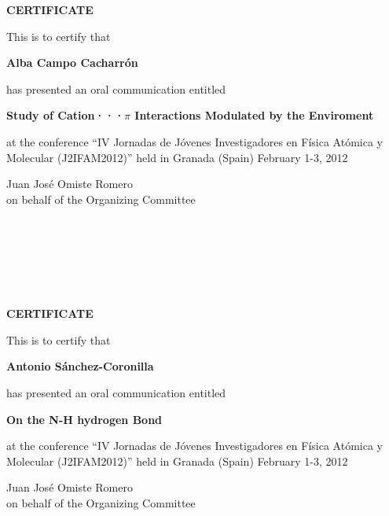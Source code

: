 \documentclass [13pt,a4paper] {letter}
\begin{document}
\begin{verbatim}






\end{verbatim}
\pagestyle{empty}
\begin{center}
{\bf {\Huge CERTIFICATE}}

\vspace {1.5cm}
This is to certify that
\vspace {1cm}

{\bf \Large  Alba  Campo  Cacharrón }
\vspace {1cm}

has presented an oral communication entitled
\vspace {1cm}

{\bf \large  Study of Cation···$\pi$ Interactions Modulated by the Enviroment  }
\vspace {1cm}

at the conference { \textquotedblleft IV Jornadas de Jóvenes Investigadores en Física Atómica y Molecular (J2IFAM2012)\textquotedblright} 
held in Granada (Spain) February 1-3, 2012
\end{center}
\vspace {3cm}
\begin{raggedleft}
Juan José Omiste Romero\\
on behalf of the Organizing Committee
\newpage
\end{raggedleft}
\begin{verbatim}






\end{verbatim}
\pagestyle{empty}
\begin{center}
{\bf {\Huge CERTIFICATE}}

\vspace {1.5cm}
This is to certify that
\vspace {1cm}

{\bf \Large  Antonio    Sánchez-Coronilla }
\vspace {1cm}

has presented an oral communication entitled
\vspace {1cm}

{\bf \large  On the N-H hydrogen Bond }
\vspace {1cm}

at the conference { \textquotedblleft IV Jornadas de Jóvenes Investigadores en Física Atómica y Molecular (J2IFAM2012)\textquotedblright} 
held in Granada (Spain) February 1-3, 2012
\end{center}
\vspace {3cm}
\begin{raggedleft}
Juan José Omiste Romero\\
on behalf of the Organizing Committee
\newpage
\end{raggedleft}
\begin{verbatim}






\end{verbatim}
\end{document}
